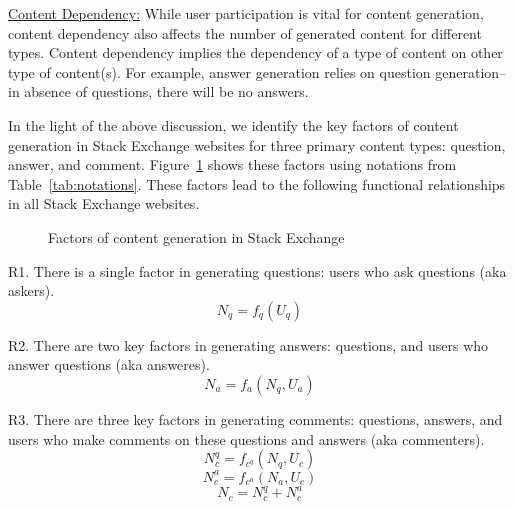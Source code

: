 \uline{Content Dependency:} While user participation is vital for content generation, content dependency also affects the number of generated content for different types. Content dependency implies the dependency of a type of content on other type of content(s). For example, answer generation relies on question generation-- in absence of questions, there will be no answers. %

In the light of the above discussion, we identify the key factors of content generation in Stack Exchange websites for three primary content types: question, answer, and comment. Figure~\ref{fig:content_factors} shows these factors using notations from Table~\ref{tab:notations}. These factors lead to the following functional relationships in all Stack Exchange websites.

\begin{figure}[hbt]
  \centering
  \caption{Factors of content generation in Stack Exchange}
  \label{fig:content_factors}
\end{figure}

R1. There is a single factor in generating questions: users who ask questions (aka askers).
\begin{equation*}
N_q = f_q(U_q)
\end{equation*}

R2. There are two key factors in generating answers: questions, and users who answer questions (aka answeres). 
\begin{equation*}
N_a = f_a(N_q, U_a)
\end{equation*}

R3. There are three key factors in generating comments: questions, answers, and users who make comments on these questions and answers (aka commenters). 
\begin{equation*}
N_c^q = f_{c^q}(N_q, U_c)
\end{equation*}
\begin{equation*}
N_c^a = f_{c^a}(N_a, U_c)
\end{equation*}
\begin{equation*}
N_c = N_c^q + N_c^a
\end{equation*}

